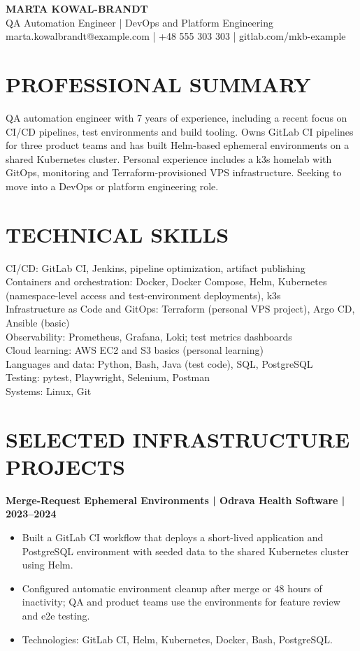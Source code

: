 \documentclass[11pt,a4paper]{article}
\begin{document}
\begin{center}
{\LARGE\bfseries\color{primarycolor} MARTA KOWAL-BRANDT}\\[0.25em]
{\large QA Automation Engineer | DevOps and Platform Engineering}\\[0.3em]
marta.kowalbrandt@example.com | +48 555 303 303 | gitlab.com/mkb-example
\end{center}

\section*{PROFESSIONAL SUMMARY}
QA automation engineer with 7 years of experience, including a recent focus on CI/CD pipelines, test environments and build tooling. Owns GitLab CI pipelines for three product teams and has built Helm-based ephemeral environments on a shared Kubernetes cluster. Personal experience includes a k3s homelab with GitOps, monitoring and Terraform-provisioned VPS infrastructure. Seeking to move into a DevOps or platform engineering role.

\section*{TECHNICAL SKILLS}
CI/CD: GitLab CI, Jenkins, pipeline optimization, artifact publishing\\
Containers and orchestration: Docker, Docker Compose, Helm, Kubernetes (namespace-level access and test-environment deployments), k3s\\
Infrastructure as Code and GitOps: Terraform (personal VPS project), Argo CD, Ansible (basic)\\
Observability: Prometheus, Grafana, Loki; test metrics dashboards\\
Cloud learning: AWS EC2 and S3 basics (personal learning)\\
Languages and data: Python, Bash, Java (test code), SQL, PostgreSQL\\
Testing: pytest, Playwright, Selenium, Postman\\
Systems: Linux, Git

\section*{SELECTED INFRASTRUCTURE PROJECTS}
\textbf{Merge-Request Ephemeral Environments | Odrava Health Software | 2023--2024}
\begin{itemize}
\item Built a GitLab CI workflow that deploys a short-lived application and PostgreSQL environment with seeded data to the shared Kubernetes cluster using Helm.
\item Configured automatic environment cleanup after merge or 48 hours of inactivity; QA and product teams use the environments for feature review and e2e testing.
\item Technologies: GitLab CI, Helm, Kubernetes, Docker, Bash, PostgreSQL.
\end{itemize}
\end{document}
